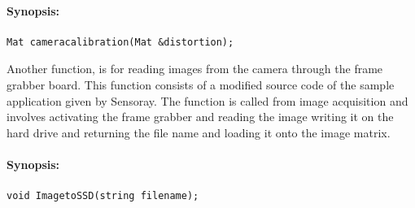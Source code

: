 \paragraph{Synopsis:}
\begin{lstlisting}
Mat cameracalibration(Mat &distortion);
\end{lstlisting}
Another function, is for reading images from the camera through the frame grabber board. This function consists of a modified source code of the sample application given by Sensoray. The function is called from image acquisition and involves activating the frame grabber and reading the image writing it on the hard drive and returning the file name  and loading  it onto the image matrix. 
\paragraph{Synopsis:}
\begin{lstlisting}
void ImagetoSSD(string filename);
\end{lstlisting}





